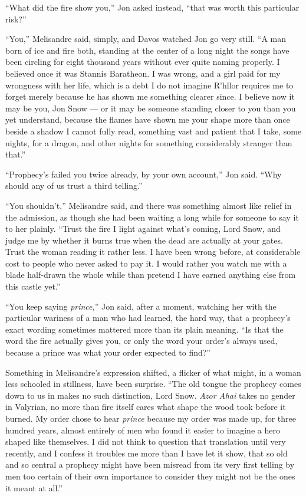 “What did the fire show you,” Jon asked instead, “that was worth this particular risk?”

“You,” Melisandre said, simply, and Davos watched Jon go very still. “A man born of ice and fire both, standing at the center of a long night the songs have been circling for eight thousand years without ever quite naming properly. I believed once it was Stannis Baratheon. I was wrong, and a girl paid for my wrongness with her life, which is a debt I do not imagine R’hllor requires me to forget merely because he has shown me something clearer since. I believe now it may be you, Jon Snow — or it may be someone standing closer to you than you yet understand, because the flames have shown me your shape more than once beside a shadow I cannot fully read, something vast and patient that I take, some nights, for a dragon, and other nights for something considerably stranger than that.”

“Prophecy’s failed you twice already, by your own account,” Jon said. “Why should any of us trust a third telling.”

“You shouldn’t,” Melisandre said, and there was something almost like relief in the admission, as though she had been waiting a long while for someone to say it to her plainly. “Trust the fire I light against what’s coming, Lord Snow, and judge me by whether it burns true when the dead are actually at your gates. Trust the woman reading it rather less. I have been wrong before, at considerable cost to people who never asked to pay it. I would rather you watch me with a blade half-drawn the whole while than pretend I have earned anything else from this castle yet.”

“You keep saying \textit{prince,}” Jon said, after a moment, watching her with the particular wariness of a man who had learned, the hard way, that a prophecy’s exact wording sometimes mattered more than its plain meaning. “Is that the word the fire actually gives you, or only the word your order’s always used, because a prince was what your order expected to find?”

Something in Melisandre’s expression shifted, a flicker of what might, in a woman less schooled in stillness, have been surprise. “The old tongue the prophecy comes down to us in makes no such distinction, Lord Snow. \textit{Azor Ahai} takes no gender in Valyrian, no more than fire itself cares what shape the wood took before it burned. My order chose to hear \textit{prince} because my order was made up, for three hundred years, almost entirely of men who found it easier to imagine a hero shaped like themselves. I did not think to question that translation until very recently, and I confess it troubles me more than I have let it show, that so old and so central a prophecy might have been misread from its very first telling by men too certain of their own importance to consider they might not be the ones it meant at all.”

